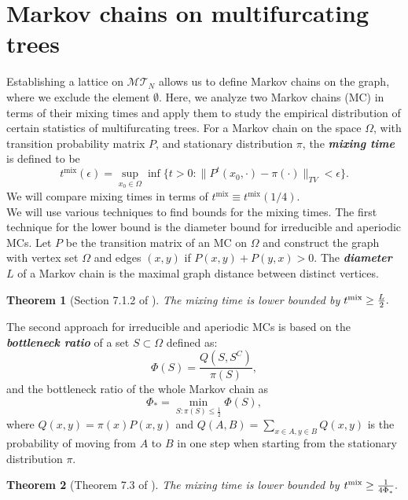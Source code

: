 \documentclass{article}
\newtheorem{theorem}{Theorem}
\begin{document}
\section{Markov chains on multifurcating trees} \label{sec:mc}

Establishing a lattice on $\mathcal{MT}_N$ allows us to define Markov chains on the graph, where we exclude the element $\emptyset$. Here, we analyze two Markov chains (MC) in terms of their mixing times and apply them to study the empirical distribution of certain statistics of multifurcating trees. For a Markov chain on the space $\Omega$, with transition probability matrix $P$, and stationary distribution $\pi$, the \textbf{\textit{mixing time}} is defined to be \[ t^{\text{mix}}(\epsilon)= \sup_{x_0 \in \Omega} \inf \{ t>0: \lVert P^t(x_0, \cdot) - \pi(\cdot) \rVert_{TV} < \epsilon\}. \] We will compare mixing times in terms of $t^{\text{mix}} \equiv t^{\text{mix}}(1/4)$. \\

We will use various techniques to find bounds for the mixing times. The first technique for the lower bound is the diameter bound for irreducible and aperiodic MCs. Let $P$ be the transition matrix of an MC on $\Omega$ and construct the graph with vertex set $\Omega$ and edges $(x,y)$ if $P(x,y) + P(y,x) >0$. The \textbf{\textit{diameter}} $L$ of a Markov chain is the maximal graph distance between distinct vertices.
\begin{theorem}[Section 7.1.2 of \cite{levin2017markov}] \label{thm:diameter-bound}
The mixing time is lower bounded by $t^{\textup{mix}}\geq \frac{L}{2}.$
\end{theorem}
The second approach for irreducible and aperiodic MCs is based on the \textit{\textbf{bottleneck ratio}} of a set $S\subset \Omega$ defined as:
\[ \Phi(S) = \frac{Q(S, S^C)}{\pi(S)},\] 
and the bottleneck ratio of the whole Markov chain as 
\begin{equation}\label{eq:bottleneck-def}
    \Phi_* = \min_{S: \pi(S) \leq \frac{1}{2}} \Phi(S),
\end{equation}
where $Q(x,y) = \pi(x) P(x,y)$ and $Q(A,B) = \sum_{x\in A, y \in B} Q(x,y)$ is the probability of moving from $A$ to $B$ in one step when starting from the stationary distribution $\pi$. 
\begin{theorem}[Theorem 7.3 of \cite{levin2017markov}] \label{thm:bottleneck_bound}
The mixing time is lower bounded by $t^{\textup{mix}} \geq \frac{1}{4\Phi_*}.$
\end{theorem}
\end{document}
